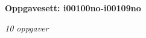 \centerline{\bf Oppgavesett: i00100no-i00109no}
\vskip 10pt
\centerline{\it 10 oppgaver}\vskip 10pt
\vskip 10pt
